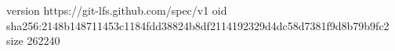 version https://git-lfs.github.com/spec/v1
oid sha256:2148b148711453c1184fdd38824b8df2114192329d4dc58d7381f9d8b79b9fc2
size 262240
